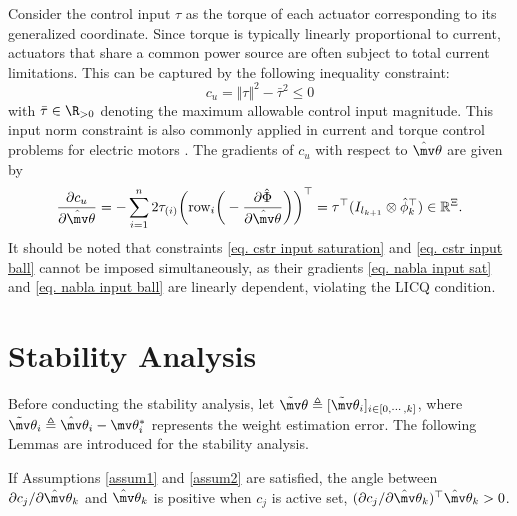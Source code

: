 \documentclass[lettersize,journal]{IEEEtran}
\newcommand*{\wth}{\mv\theta}
\begin{document}
Consider the control input $\tau$ as the torque of each actuator corresponding to its generalized coordinate. Since torque is typically linearly proportional to current, actuators that share a common power source are often subject to total current limitations. This can be captured by the following inequality constraint: 
\begin{equation}
    c_{u}=\Vert\tau\Vert^2 -\bar\tau^2  \le 0
    \label{eq. cstr input ball}
\end{equation}
with $\bar\tau\in\R_{>0}$ denoting the maximum allowable control input magnitude. This input norm constraint is also commonly applied in current and torque control problems for electric motors \cite{RN62}.
The gradients of $c_{u}$ with respect to $\hat\wth$ are given by
\begin{equation}
    {\partial \mathbf \mathbf c_{u} \over \partial \hat\wth}
    = -\sum_{i=1}^n 2\tau_{(i)} 
    \bigg(
        \text{row}_i
        \bigg(
            -{\partial \hat\Phi\over\partial\hat\wth}
        \bigg)
    \bigg)^\top  
    = \tau^\top (I_{l_{k+1}}\otimes \hat\phi_k^\top)
    \in \mathbb R^{\Xi}.
    \label{eq. nabla input ball}
\end{equation}
It should be noted that constraints \eqref{eq. cstr input saturation} and \eqref{eq. cstr input ball} cannot be imposed simultaneously, as their gradients \eqref{eq. nabla input sat} and \eqref{eq. nabla input ball} are linearly dependent, violating the LICQ condition.

\section{Stability Analysis}\label{sec:stability}

Before conducting the stability analysis, let $\tilde\wth\triangleq [\tilde\wth_i]_{i\in[0,\cdots,k]}$, where $\tilde\wth_i\triangleq\hat\wth_i-\wth^*_i$ represents the weight estimation error. The following Lemmas are introduced for the stability analysis. %
\begin{lem}
    If Assumptions \ref{assum1} and \ref{assum2} are satisfied, the angle between $\partial c_j/\partial \hat\wth_k$ and $\hat\wth_k$ is positive when $c_j$ is active set, \ie $(\partial c_j/\partial \hat\wth_k)^\top\hat\wth_k>0$.
    \label{lem1}
\end{lem}
\end{document}
